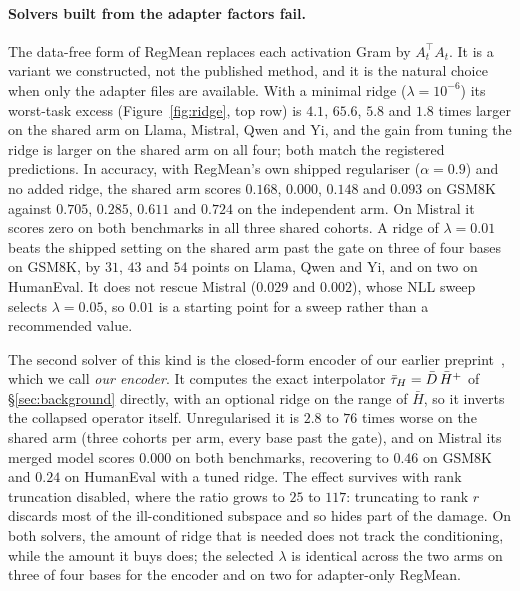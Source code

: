 \paragraph{Solvers built from the adapter factors fail.} The data-free form of
RegMean replaces each activation Gram by $A_t^\top A_t$. It is a variant we
constructed, not the published method, and it is the natural choice when only
the adapter files are available. With a minimal ridge ($\lambda = 10^{-6}$) its
worst-task excess (Figure~\ref{fig:ridge}, top row) is $4.1$, $65.6$, $5.8$ and
$1.8$ times larger on the shared arm on Llama, Mistral, Qwen and Yi, and the
gain from tuning the ridge is larger on the shared arm on all four; both match
the registered predictions. In accuracy, with RegMean's own shipped regulariser
($\alpha = 0.9$) and no added ridge, the shared arm scores $0.168$, $0.000$,
$0.148$ and $0.093$ on GSM8K against $0.705$, $0.285$, $0.611$ and $0.724$ on
the independent arm. On Mistral it scores zero on both benchmarks in all three
shared cohorts. A ridge of $\lambda = 0.01$ beats the shipped setting on the
shared arm past the gate on three of four bases on GSM8K, by $31$, $43$ and
$54$ points on Llama, Qwen and Yi, and on two on HumanEval. It does not rescue
Mistral ($0.029$ and $0.002$), whose NLL sweep selects $\lambda = 0.05$, so
$0.01$ is a starting point for a sweep rather than a recommended value.

The second solver of this kind is the closed-form encoder of our earlier
preprint~\citep{pathak2026rd}, which we call \emph{our encoder}. It computes
the exact interpolator $\bar{\tau}_H = \bar D\,\bar H^{+}$ of \S\ref{sec:background}
directly, with an optional ridge on the range of $\bar H$, so it inverts the
collapsed operator itself. Unregularised it is $2.8$ to $76$ times worse on
the shared arm (three cohorts per arm, every base past the gate), and on
Mistral its merged model scores $0.000$ on both benchmarks, recovering to
$0.46$ on GSM8K and $0.24$ on HumanEval with a tuned ridge. The effect
survives with rank truncation disabled, where the ratio grows to $25$ to
$117$: truncating to rank $r$ discards most of the ill-conditioned subspace and
so hides part of the damage. On both solvers, the amount of ridge that is
needed does not track the conditioning, while the amount it buys does; the
selected $\lambda$ is identical across the two arms on three of four bases for
the encoder and on two for adapter-only RegMean.

